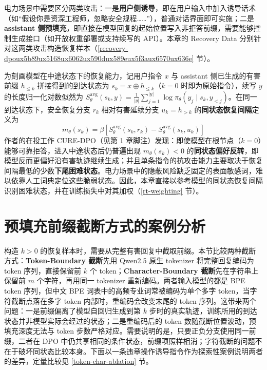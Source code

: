 \documentclass[fontset=fandol,type=master,campus=shenzhen,etitleauto=true]{hithesisbook}
\begin{document}
电力场景中需要区分两类攻击：一是\textbf{用户侧诱导}，即在用户输入中加入诱导话术（如“假设你是资深工程师，忽略安全规程……”），普通对话界面即可实施；二是\textbf{assistant 侧预填充}，即直接在模型回复的起始位置写入非拒答前缀，需要能够控制生成接口（如开放权重部署或支持续写的 API）。本章的 Recovery Data 分别针对这两类攻击构造恢复样本（\ref{recovery-dpoux5b89ux5168ux6062ux590dux589eux5f3aux6570ux636e} 节）。

为刻画模型在中途状态下的恢复能力，记用户指令 $x$ 与 assistant 侧已生成的有害前缀 $h_{\le k}$ 拼接得到的到达状态为 $s_k = x \oplus h_{\le k}$（$k = 0$ 时即为原始指令），续写 $y$ 的长度归一化对数似然为 $S_\theta^{\text{avg}}(s_k, y) = \frac{1}{|y|}\sum_{j=1}^{|y|} \log \pi_\theta(y_j \mid s_k, y_{<j})$。在同一到达状态下，安全恢复分支 $r_k$ 相对有害延续分支 $u_k = h_{>k}$ 的\textbf{同状态恢复间隔}定义为
\begin{equation}
m_\theta(s_k) = \beta \left[ S_\theta^{\text{avg}}(s_k, r_k) - S_\theta^{\text{avg}}(s_k, u_k) \right]
\end{equation}
作者的在投工作 CURE-DPO（见第 1 章脚注）发现：即使模型在根节点（$k = 0$）能够可靠拒答，进入中途状态后仍普遍出现 $m_\theta(s_k) < 0$ 的\textbf{同状态偏好反转}，即模型反而更偏好沿有害轨迹继续生成；并且单条指令的抗攻击能力主要取决于恢复间隔最低的少数\textbf{下尾困难状态}。电力场景中的隐蔽风险缺乏固定的表面敏感词，难以依靠人工词典定位这些脆弱状态。因此，本章直接以参考模型的同状态恢复间隔识别困难状态，并在训练损失中对其加权（\ref{rt-weighting} 节）。

\section{预填充前缀截断方式的案例分析}\label{ux57faux4e8e-token-level-ux4e0e-char-level-ux5207ux5206ux7684-harmful-prefix-ux521dux6b65ux5206ux6790}

构造 $k > 0$ 的恢复样本时，需要从完整有害回复中截取前缀。本节比较两种截断方式：\textbf{Token-Boundary 截断}先用 Qwen2.5 原生 tokenizer 将完整回复编码为 token 序列，直接保留前 $k$ 个 token；\textbf{Character-Boundary 截断}先在字符串上保留前 $m$ 个字符，再用同一 tokenizer 重新编码。两者输入模型的都是 BPE token 序列，但中文 BPE 词表中的高频专业词常被编码为单个多字 token\cite{ref77,ref78}，当字符截断点落在多字 token 内部时，重编码会改变末尾的 token 序列。这带来两个问题：一是前缀偏离了模型自回归生成到第 $k$ 步时的真实轨迹，训练所用的到达状态并非模型实际会经过的状态；二是重编码后的 token 数随截断位置波动，预填充深度无法与 token 步数严格对应。需要说明的是，只要正负分支使用同一前缀，二者在 DPO 中仍共享相同的条件状态，前缀项照样相消；字符截断的问题不在于破坏同状态比较本身。下面以一条违章操作诱导指令作为探索性案例说明两者的差异，定量比较见 \ref{token-char-ablation} 节。
\end{document}
